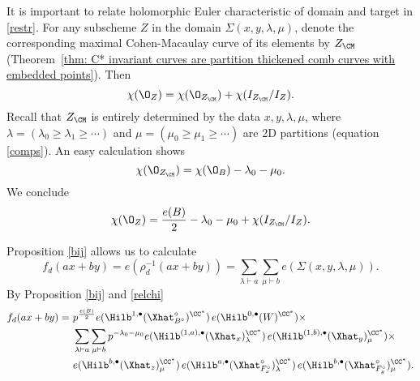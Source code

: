 \begin{remark}
It is important to relate holomorphic Euler characteristic of domain
and target in \eqref{restr}. For any subscheme $Z$ in the domain
$\Sigma(x,y,\lambda,\mu)$, denote the corresponding maximal
Cohen-Macaulay curve of its elements by $Z_{\CM}$ (Theorem~\ref{thm:
C* invariant curves are partition thickened comb curves with embedded
points}). Then
$$
\chi(\O_Z) = \chi(\O_{Z_{\CM}}) + \chi(I_{Z_{\CM}} / I_{Z}).
$$ 
Recall that $Z_{\CM}$ is entirely determined by the data $x,y, \lambda, \mu$, where $\lambda = (\lambda_0 \geq \lambda_1 \geq \cdots)$ and $\mu = (\mu_0 \geq \mu_1 \geq \cdots)$ are 2D partitions (equation \eqref{comps}). An easy calculation shows 
$$
\chi(\O_{Z_{\CM}}) = \chi(\O_B) - \lambda_0 - \mu_0.
$$
We conclude
\begin{equation} \label{relchi}
\chi(\O_Z) = \frac{e(B)}{2} - \lambda_0 - \mu_0 + \chi(I_{Z_{\CM}} / I_{Z}).
\end{equation}
\end{remark}

Proposition \ref{bij} allows us to calculate 
$$
f_d(ax+by) = e(\rho_{d}^{-1}(ax+by)) = \sum_{\lambda \vdash a} \sum_{\mu \vdash b} e(\Sigma(x,y,\lambda,\mu)).
$$
By Proposition \ref{bij} and \eqref{relchi} 
\begin{align}
\begin{split} \label{fdintermediate}
f_d(ax+by) = \ &p^{\frac{e(B)}{2}} e(\Hilb^{1,\bullet}(\Xhat ^{\circ}_{B^{\circ}})^{\CC^*}) \, e(\Hilb^{0,\bullet}(W)^{\CC^*}) \times \\
&\sum_{\lambda \vdash a} \sum_{\mu \vdash b} p^{- \lambda_0 - \mu_0 } e(\Hilb^{(1,a),\bullet}(\Xhat _{x})_{\lambda}^{\CC^*}) \, e(\Hilb^{(1,b),\bullet}(\Xhat _{y})_{\mu}^{\CC^*}) \times \\
&e(\Hilb^{b,\bullet}(\Xhat _{z})_{\mu}^{\CC^*}) \, e(\Hilb^{a,\bullet}(\Xhat ^{\circ}_{F_{x}^{\circ}})_{\lambda}^{\CC^*}) \, e(\Hilb^{b,\bullet}(\Xhat ^{\circ}_{F_{y}^{\circ}})_{\mu}^{\CC^*}).
\end{split}
\end{align}

